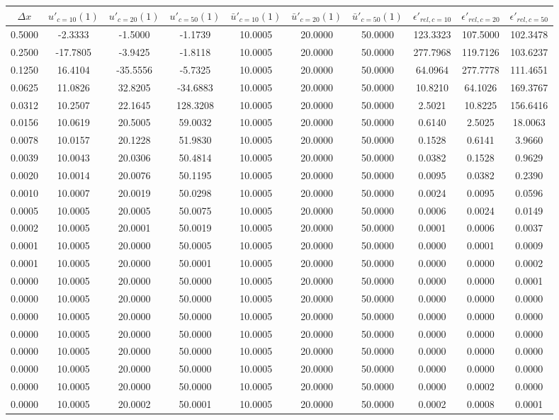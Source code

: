 \begin{tabular}{|c|c|c|c|c|c|c|c|c|c|}
\hline
\textbf{$\Delta x$}&\textbf{$u'_{c=10}(1)$}&\textbf{$u'_{c=20}(1)$}&\textbf{$u'_{c=50}(1)$}&\textbf{$\bar{u}'_{c=10}(1)$}&\textbf{$\bar{u}'_{c=20}(1)$}&\textbf{$\bar{u}'_{c=50}(1)$}&\textbf{$\epsilon'_{rel,c=10}$}&\textbf{$\epsilon'_{rel,c=20}$}&\textbf{$\epsilon'_{rel,c=50}$}\\\hline
0.5000&-2.3333&-1.5000&-1.1739&10.0005&20.0000&50.0000&123.3323&107.5000&102.3478\\\hline
0.2500&-17.7805&-3.9425&-1.8118&10.0005&20.0000&50.0000&277.7968&119.7126&103.6237\\\hline
0.1250&16.4104&-35.5556&-5.7325&10.0005&20.0000&50.0000&64.0964&277.7778&111.4651\\\hline
0.0625&11.0826&32.8205&-34.6883&10.0005&20.0000&50.0000&10.8210&64.1026&169.3767\\\hline
0.0312&10.2507&22.1645&128.3208&10.0005&20.0000&50.0000&2.5021&10.8225&156.6416\\\hline
0.0156&10.0619&20.5005&59.0032&10.0005&20.0000&50.0000&0.6140&2.5025&18.0063\\\hline
0.0078&10.0157&20.1228&51.9830&10.0005&20.0000&50.0000&0.1528&0.6141&3.9660\\\hline
0.0039&10.0043&20.0306&50.4814&10.0005&20.0000&50.0000&0.0382&0.1528&0.9629\\\hline
0.0020&10.0014&20.0076&50.1195&10.0005&20.0000&50.0000&0.0095&0.0382&0.2390\\\hline
0.0010&10.0007&20.0019&50.0298&10.0005&20.0000&50.0000&0.0024&0.0095&0.0596\\\hline
0.0005&10.0005&20.0005&50.0075&10.0005&20.0000&50.0000&0.0006&0.0024&0.0149\\\hline
0.0002&10.0005&20.0001&50.0019&10.0005&20.0000&50.0000&0.0001&0.0006&0.0037\\\hline
0.0001&10.0005&20.0000&50.0005&10.0005&20.0000&50.0000&0.0000&0.0001&0.0009\\\hline
0.0001&10.0005&20.0000&50.0001&10.0005&20.0000&50.0000&0.0000&0.0000&0.0002\\\hline
0.0000&10.0005&20.0000&50.0000&10.0005&20.0000&50.0000&0.0000&0.0000&0.0001\\\hline
0.0000&10.0005&20.0000&50.0000&10.0005&20.0000&50.0000&0.0000&0.0000&0.0000\\\hline
0.0000&10.0005&20.0000&50.0000&10.0005&20.0000&50.0000&0.0000&0.0000&0.0000\\\hline
0.0000&10.0005&20.0000&50.0000&10.0005&20.0000&50.0000&0.0000&0.0000&0.0000\\\hline
0.0000&10.0005&20.0000&50.0000&10.0005&20.0000&50.0000&0.0000&0.0000&0.0000\\\hline
0.0000&10.0005&20.0000&50.0000&10.0005&20.0000&50.0000&0.0000&0.0000&0.0000\\\hline
0.0000&10.0005&20.0000&50.0000&10.0005&20.0000&50.0000&0.0000&0.0002&0.0000\\\hline
0.0000&10.0005&20.0002&50.0001&10.0005&20.0000&50.0000&0.0002&0.0008&0.0001\\\hline
\end{tabular}
